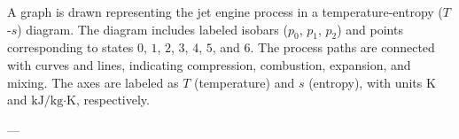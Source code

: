 A graph is drawn representing the jet engine process in a temperature-entropy (\( T \)-\( s \)) diagram. The diagram includes labeled isobars (\( p_0 \), \( p_1 \), \( p_2 \)) and points corresponding to states \( 0 \), \( 1 \), \( 2 \), \( 3 \), \( 4 \), \( 5 \), and \( 6 \). The process paths are connected with curves and lines, indicating compression, combustion, expansion, and mixing. The axes are labeled as \( T \) (temperature) and \( s \) (entropy), with units \( \text{K} \) and \( \text{kJ/kg·K} \), respectively.  

---